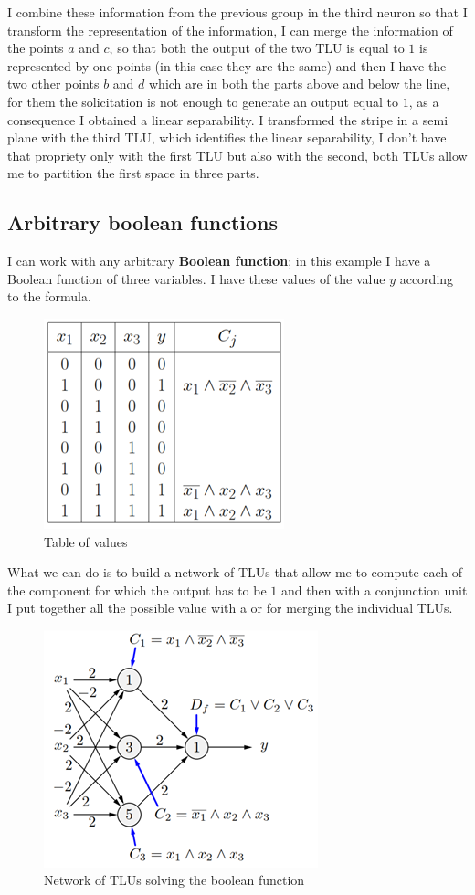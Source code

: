 \documentclass{article}
\begin{document}
I combine these information from the previous group in the third neuron so that I transform
the representation of the information, I can merge the information of the points $a$ and $c$,
so that both the output of the two TLU is equal to $1$ is represented by one points (in this case
they are the same) and then I have the two other points $b$ and $d$ which are in both the parts
above and below the line, for them the solicitation is not enough to generate an output
equal to $1$, as a consequence I obtained a linear separability.
\newline\newline
I transformed the stripe in a semi plane with the third TLU, which identifies the linear
separability, I don’t have that propriety only with the first TLU but also with the second,
both TLUs allow me to partition the first space in three parts.

\subsection{Arbitrary boolean functions}
I can work with any arbitrary \textbf{Boolean function}; in this example I have a
Boolean function of three variables. I have these values of the value $y$ according to the formula.
\begin{figure}[H]
    \includegraphics[scale=0.6]{images/arb_bool_funcs.png}
    \centering
    \caption{Table of values}
\end{figure}
What we can do is to build a network of TLUs that allow me to compute each of the component
for which the output has to be $1$ and then with a conjunction unit I put together all
the possible value with a or for merging the individual TLUs.
\begin{figure}[H]
    \includegraphics[scale=0.8]{images/arb_bool_funcs_graph.png}
    \centering
    \caption{Network of TLUs solving the boolean function}
\end{figure}
\end{document}
